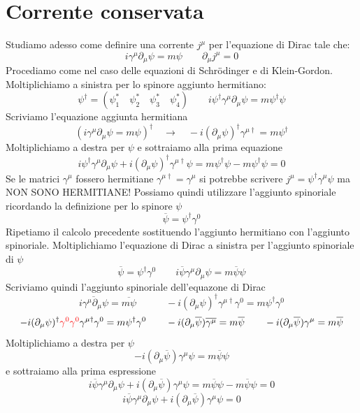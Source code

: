 \section{Corrente conservata}
Studiamo adesso come definire una corrente $j^\mu$ per l'equazione di Dirac tale che:
\begin{equation*}
    i\gamma^\mu\partial_\mu\psi=m\psi \qquad \partial_\mu j^\mu=0
\end{equation*}
Procediamo come nel caso delle equazioni di Schr\"odinger e di Klein-Gordon. Moltiplichiamo a sinistra per lo spinore aggiunto hermitiano:
$$
\psi^\dagger = (\psi_1^* \quad \psi_2^* \quad \psi_3^* \quad \psi_4^*) \qquad i\psi^\dagger \gamma^\mu \partial_\mu \psi = m\psi^\dagger \psi
$$
Scriviamo l'equazione aggiunta hermitiana
$$
(i\gamma^\mu \partial_\mu \psi = m\psi)^\dagger \quad \to \quad -i(\partial_\mu \psi)^\dagger \gamma^{\mu\dagger} = m\psi^\dagger
$$
Moltiplichiamo a destra per $\psi$ e sottraiamo alla prima equazione 
$$
i\psi^\dagger \gamma^\mu \partial_\mu \psi + i(\partial_\mu \psi)^\dagger \gamma^{\mu\dagger} \psi = m\psi^\dagger \psi - m\psi^\dagger \psi = 0
$$
Se le matrici $\gamma^\mu$ fossero hermitiane $\gamma^{\mu\dagger}=\gamma^\mu$ si potrebbe scrivere $j^\mu=\psi^\dagger\gamma^\mu\psi$ ma NON SONO HERMITIANE! Possiamo quindi utilizzare l'aggiunto spinoriale ricordando la definizione per lo spinore $\psi$
$$
\overline{\psi} = \psi^\dagger \gamma^0
$$
Ripetiamo il calcolo precedente sostituendo l'aggiunto hermitiano con l'aggiunto spinoriale. Moltiplichiamo l'equazione di Dirac a sinistra per l'aggiunto spinoriale di $\psi$
$$
\overline{\psi} = \psi^\dagger \gamma^0 \qquad i\overline{\psi}\gamma^\mu \partial_\mu \psi = m\overline{\psi}\psi
$$
Scriviamo quindi l'aggiunto spinoriale dell'equazone di Dirac
$$
\overline{i\gamma^\mu \partial_\mu \psi} = \overline{m\psi} \quad \qquad -i(\partial_\mu \psi)^\dagger \gamma^{\mu \dagger} \gamma^0 = m\psi^\dagger \gamma^0
$$
$$
-i(\partial_\mu \psi)^\dagger \textcolor{red}{\gamma^0 \gamma^0} \gamma^{\mu \dagger} \gamma^0 = m\psi^\dagger \gamma^0 \qquad -i(\partial_\mu \overline{\psi}) \overline{\gamma^\mu} = m\overline{\psi} \qquad -i(\partial_\mu \overline{\psi}) \gamma^\mu = m\overline{\psi}
$$
Moltiplichiamo a destra per $\psi$
$$
-i(\partial_\mu \overline{\psi}) \gamma^\mu \psi = m\overline{\psi}\psi
$$
e sottraiamo alla prima espressione
$$
i\overline{\psi}\gamma^\mu \partial_\mu \psi + i(\partial_\mu \overline{\psi}) \gamma^\mu \psi = m\overline{\psi}\psi - m\overline{\psi}\psi = 0
$$
$$
i\overline{\psi}\gamma^\mu \partial_\mu \psi + i(\partial_\mu \overline{\psi}) \gamma^\mu \psi = 0
$$
